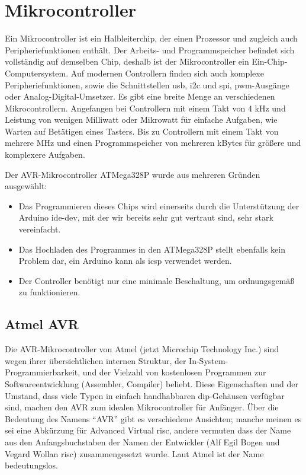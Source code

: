 \section{Mikrocontroller}
Ein Mikrocontroller ist ein Halbleiterchip, der einen Prozessor und zugleich auch Peripheriefunktionen enthält.
Der Arbeits- und Programmspeicher befindet sich vollständig auf demselben Chip, deshalb ist der Mikrocontroller ein Ein-Chip-Computersystem.
Auf modernen Controllern finden sich auch komplexe Peripheriefunktionen, sowie die Schnittstellen \ac{usb}, \ac{i2c} und \ac{spi}, \ac{pwm}-Ausgänge oder Analog-Digital-Umsetzer.
Es gibt eine breite Menge an verschiedenen Mikrocontrollern.
Angefangen bei Controllern mit einem Takt von 4 kHz und Leistung von wenigen Milliwatt oder Mikrowatt für einfache Aufgaben, wie Warten auf Betätigen eines Tasters.
Bis zu Controllern mit einem Takt von mehrere MHz und einen Programmspeicher von mehreren kBytes für größere und komplexere Aufgaben.\par

Der AVR-Mikrocontroller ATMega328P wurde aus mehreren Gründen ausgewählt:
\begin{itemize}
	\item Das Programmieren dieses Chips wird einerseits durch die Unterstützung der Arduino \ac{ide-dev}, mit der wir bereits sehr gut vertraut sind, sehr stark vereinfacht.
	\item Das Hochladen des Programmes in den ATMega328P stellt ebenfalls kein Problem dar, ein Arduino kann als \ac{icsp} verwendet werden.
	\item Der Controller benötigt nur eine minimale Beschaltung, um ordnungsgemäß zu funktionieren.
\end{itemize}

\subsection{Atmel AVR}
Die AVR-Mikrocontroller von Atmel (jetzt Microchip Technology Inc.) sind wegen ihrer übersichtlichen internen Struktur, der In-System-Programmierbarkeit, und der Vielzahl von kostenlosen Programmen zur Softwareentwicklung (Assembler, Compiler) beliebt. Diese Eigenschaften und der Umstand, dass viele Typen in einfach handhabbaren \ac{dip}-Gehäusen verfügbar sind, machen den AVR zum idealen Mikrocontroller für Anfänger.
Über die Bedeutung des Namens \enquote{AVR} gibt es verschiedene Ansichten; manche meinen es sei eine Abkürzung für Advanced Virtual \ac{risc}, andere vermuten dass der Name aus den Anfangsbuchstaben der Namen der Entwickler (Alf Egil Bogen und Vegard Wollan \ac{risc}) zusammengesetzt wurde. Laut Atmel ist der Name bedeutungslos.

